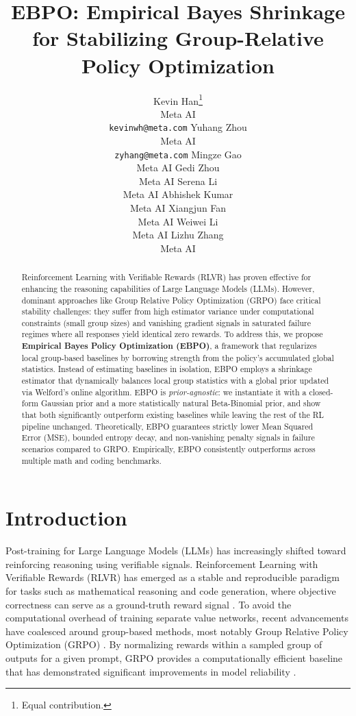 \documentclass{article}
\title{EBPO: Empirical Bayes Shrinkage for Stabilizing Group-Relative Policy Optimization}
\author{%
  Kevin Han\thanks{Equal contribution.} \\
  Meta AI \\
  \texttt{kevinwh@meta.com}
  \And
  Yuhang Zhou\footnotemark[1] \\
  Meta AI \\
  \texttt{zyhang@meta.com}
  \And
  Mingze Gao \\
  Meta AI
  \AND
  Gedi Zhou \\
  Meta AI
  \And
  Serena Li \\
  Meta AI
  \And
  Abhishek Kumar \\
  Meta AI
  \AND
  Xiangjun Fan \\
  Meta AI
  \And
  Weiwei Li \\
  Meta AI
  \And
  Lizhu Zhang \\
  Meta AI
}
\theoremstyle{plain}
\theoremstyle{definition}
\theoremstyle{remark}
\begin{document}
\maketitle

\begin{abstract}
Reinforcement Learning with Verifiable Rewards (RLVR) has proven effective for enhancing the reasoning capabilities of Large Language Models (LLMs). However, dominant approaches like Group Relative Policy Optimization (GRPO) face critical stability challenges: they suffer from high estimator variance under computational constraints (small group sizes) and vanishing gradient signals in saturated failure regimes where all responses yield identical zero rewards. To address this, we propose \textbf{Empirical Bayes Policy Optimization (EBPO)}, a framework that regularizes local group-based baselines by borrowing strength from the policy's accumulated global statistics. Instead of estimating baselines in isolation, EBPO employs a shrinkage estimator that dynamically balances local group statistics with a global prior updated via Welford's online algorithm. EBPO is \emph{prior-agnostic}: we instantiate it with a closed-form Gaussian prior and a more statistically natural Beta-Binomial prior, and show that both significantly outperform existing baselines while leaving the rest of the RL pipeline unchanged. Theoretically, EBPO guarantees strictly lower Mean Squared Error (MSE), bounded entropy decay, and non-vanishing penalty signals in failure scenarios compared to GRPO. Empirically, EBPO consistently outperforms across multiple math and coding benchmarks.
\end{abstract}

\section{Introduction}

Post-training for Large Language Models (LLMs) has increasingly shifted toward reinforcing reasoning using verifiable signals. Reinforcement Learning with Verifiable Rewards (RLVR) has emerged as a stable and reproducible paradigm for tasks such as mathematical reasoning and code generation, where objective correctness can serve as a ground-truth reward signal \citep{shao2024deepseekmath, guo2025deepseek}. To avoid the computational overhead of training separate value networks, recent advancements have coalesced around group-based methods, most notably Group Relative Policy Optimization (GRPO) \citep{shao2024deepseekmath}. By normalizing rewards within a sampled group of outputs for a given prompt, GRPO provides a computationally efficient baseline that has demonstrated significant improvements in model reliability \citep{shao2024deepseekmath, yu2025dapo}.
\end{document}
